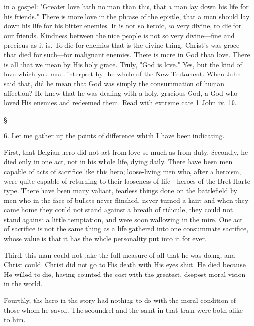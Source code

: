 \documentclass[12pt,letterpaper,oneside]{book}
\begin{document}
in a gospel: "Greater love hath no man than 
this, that a man lay down his life for his 
friends." There is more love in the phrase 
of the epistle, that a man should lay down 
his life for his bitter enemies. It is not so 
heroic, so very divine, to die for our friends. 
Kindness between the nice people is not so 
very divine---fine and precious as it is. To die 
for enemies that is the divine thing. Christ's 
was grace that died for such---for malignant 
enemies. There is more in God than love. 
There is all that we mean by His holy grace. 
Truly, "God is love." Yes, but the kind of love 
which you must interpret by the whole of 
the New Testament. When John said that, did 
he mean that God was simply the consummation 
of human affection? He knew that he 
was dealing with a holy, gracious God, a God 
who loved His enemies and redeemed them. 
Read with extreme care 1 John iv. 10. 

\begin{center} \S \end{center}

6. Let me gather up the points of difference 
which I have been indicating. 

First, that Belgian hero did not act from love 
so much as from duty. Secondly, he died only 
in one act, not in his whole life, dying daily. 
There have been men capable of acts of sacrifice 
like this hero; loose-living men who, after 
a heroism, were quite capable of returning to 
their looseness of life---heroes of the Bret Harte 
type. There have been many valiant, fearless 
things done on the battlefield by men who in 
the face of bullets never flinched, never turned 
a hair; and when they came home they could 
not stand against a breath of ridicule, they 
could not stand against a little temptation, and 
were soon wallowing in the mire. One act of 
sacrifice is not the same thing as a life gathered 
into one consummate sacrifice, whose value is 
that it has the whole personality put into it 
for ever. 

Third, this man could not take the full 
measure of all that he was doing, and Christ 
could. Christ did not go to His death with 
His eyes shut. He died because He willed to 
die, having counted the cost with the greatest, 
deepest moral vision in the world. 

Fourthly, the hero in the story had nothing 
to do with the moral condition of those whom 
he saved. The scoundrel and the saint in that 
train were both alike to him. 
\end{document}
